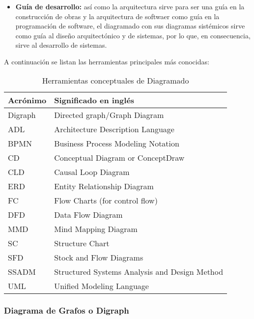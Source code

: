 \begin{itemize}
\item \textbf{Guía de desarrollo:} así como la arquitectura sirve para ser una guía en la construcción de obras y la arquitectura de softwaer como guía en la programación de software, el diagramado con sus diagramas sistémicos sirve como guía al diseño arquitectónico y de sistemas, por lo que, en consecuencia, sirve al desarrollo de sistemas.

\end{itemize}

A continuación se listan las herramientas principales más conocidas:

\begin{table}[h]
\centering
\caption{Herramientas conceptuales de Diagramado}
\label{Herramientas-conceptuales-de-Diagramado}
\begin{tabular}{|l|l|}
\hline
Acrónimo & Significado en inglés                         \\ \hline
Digraph  & Directed graph/Graph Diagram                  \\ \hline
ADL      & Architecture Description Language             \\ \hline
BPMN     & Business Process Modeling Notation            \\ \hline
CD       & Conceptual Diagram or ConceptDraw             \\ \hline
CLD      & Causal Loop Diagram                           \\ \hline
ERD      & Entity Relationship Diagram                   \\ \hline
FC       & Flow Charts (for control flow)                \\ \hline
DFD      & Data Flow Diagram                             \\ \hline
MMD      & Mind Mapping Diagram                          \\ \hline
SC       & Structure Chart                               \\ \hline
SFD      & Stock and Flow Diagrams                       \\ \hline
SSADM    & Structured Systems Analysis and Design Method \\ \hline
UML      & Unified Modeling Language                     \\ \hline
\end{tabular}
\end{table}

\subsubsection{Diagrama de Grafos o Digraph}

